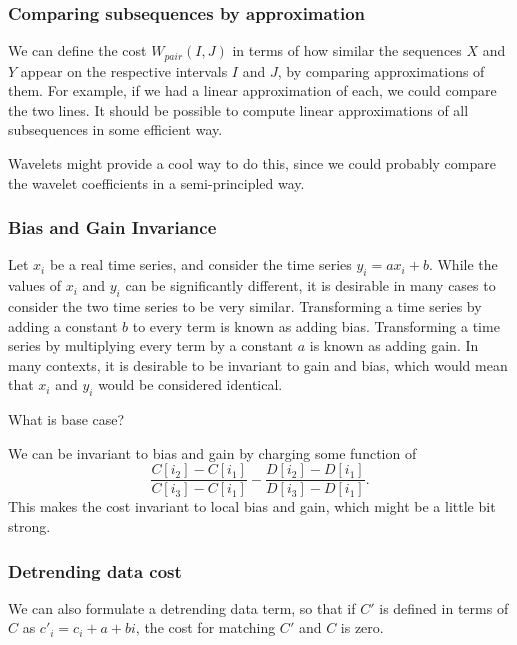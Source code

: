 \subsubsection{Comparing subsequences by approximation}

We can define the cost $W_{pair}(I,J)$ in terms of how similar the
sequences $X$ and $Y$ appear on the respective intervals $I$ and $J$,
by comparing approximations of them. For example, if we had a linear
approximation of each, we could compare the two lines. It should be
possible to compute linear approximations of all subsequences in some
efficient way.

Wavelets might provide a cool way to do this, since we could probably
compare the wavelet coefficients in a semi-principled way.

\subsubsection{Bias and Gain Invariance}

Let $x_i$ be a real time series, and consider the time series $y_i = a x_i
+ b$. While the values of $x_i$ and $y_i$ can be significantly
different, it is desirable in many cases to consider the two time
series to be very similar. Transforming a time series by adding a
constant $b$ to every term is known as adding bias. Transforming a
time series by multiplying every term by a constant $a$ is known as
adding gain. In many contexts, it is desirable to be invariant to gain
and bias, which would mean that $x_i$ and $y_i$ would be considered
identical.

What is base case?

We can be invariant to bias and gain by charging some function of
$$\frac{C[i_2] - C[i_1]}{C[i_3] - C[i_1]} - \frac{D[i_2] - D[i_1]}{D[i_3] - D[i_1]}.$$
This makes the cost invariant to local bias and gain, which might be a little bit strong.

\subsubsection{Detrending data cost}
We can also formulate a detrending data term, so that if $C'$ is
defined in terms of $C$ as $c'_i = c_i + a + bi$, the cost for
matching $C'$ and $C$ is zero.

